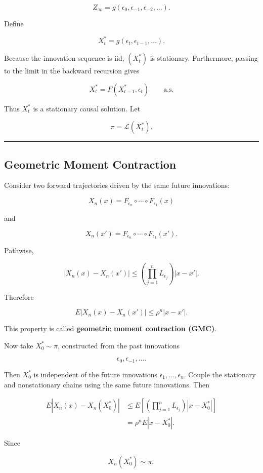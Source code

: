 \[Z_\infty
=
g(\epsilon_0,\epsilon_{-1},\epsilon_{-2},\ldots).\]

Define

\[X_t^*
=
g(\epsilon_t,\epsilon_{t-1},\ldots).\]

Because the innovation sequence is iid, \((X_t^*)\) is stationary. Furthermore, passing to the limit in the backward recursion gives

\[X_t^*=F(X_{t-1}^*,\epsilon_t)
\qquad\text{a.s.}\]

Thus \(X_t^*\) is a stationary causal solution. Let

\[\pi=\mathcal L(X_t^*).\]

\begin{center}\rule{0.5\linewidth}{0.5pt}\end{center}

\subsection*{Geometric Moment Contraction}
Consider two forward trajectories driven by the same future innovations:

\[X_n(x)
=
F_{\epsilon_n}\circ\cdots\circ F_{\epsilon_1}(x)\]

and

\[X_n(x')
=
F_{\epsilon_n}\circ\cdots\circ F_{\epsilon_1}(x').\]

Pathwise,

\[|X_n(x)-X_n(x')|
\le
\left(\prod_{j=1}^nL_{\epsilon_j}\right)|x-x'|.\]

Therefore

\[\boxed{
E|X_n(x)-X_n(x')|
\le
\rho^n|x-x'|.
}\]

This property is called \textbf{geometric moment contraction (GMC)}.

Now take \(X_0^*\sim\pi\), constructed from the past innovations

\[\epsilon_0,\epsilon_{-1},\ldots.\]

Then \(X_0^*\) is independent of the future innovations \(\epsilon_1,\ldots,\epsilon_n\). Couple the stationary and nonstationary chains using the same future innovations. Then

\[\begin{aligned}
E|X_n(x)-X_n(X_0^*)|
&\le
E\left[
\left(\prod_{j=1}^nL_{\epsilon_j}\right)
|x-X_0^*|
\right]\\
&=
\rho^nE|x-X_0^*|.
\end{aligned}\]

Since

\[X_n(X_0^*)\sim\pi,\]

